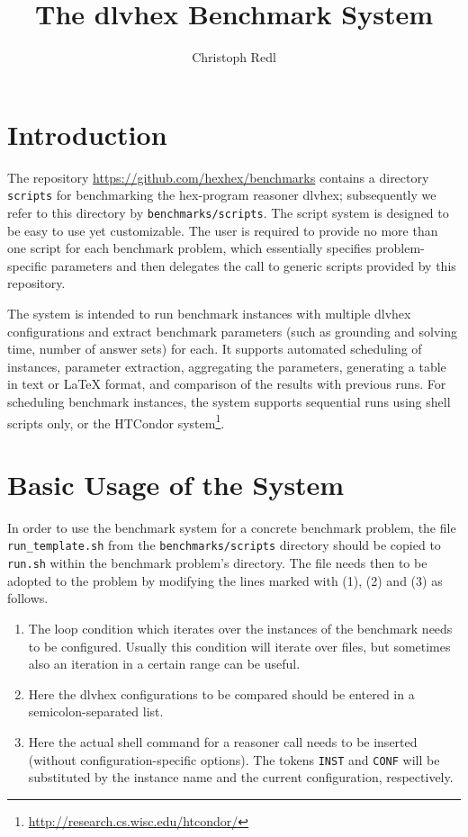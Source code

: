 \documentclass[a4paper]{article}
\newcommand{\dlvhex}{{\sc dlvhex}}
\newcommand{\hex}{{\sc hex}}
\begin{document}
	
	\title{The \dlvhex{} Benchmark System}
	\author{Christoph Redl}
	\maketitle
	
	\section{Introduction}
	\label{sec:introduction}

		The repository \url{https://github.com/hexhex/benchmarks}
		contains a directory {\tt scripts} for benchmarking the \hex-program reasoner \dlvhex;
		subsequently we refer to this directory by {\tt benchmarks/scripts}.
		The script system is designed to be easy to use yet customizable.
		The user is required to provide no more than one script for each benchmark problem,
		which essentially specifies problem-specific parameters and then delegates the call
		to generic scripts provided by this repository.
		
		The system
		is intended to run benchmark instances with multiple \dlvhex{} configurations
		and extract benchmark parameters (such as grounding and solving time, number of answer sets) for each.
		It supports automated scheduling of instances, parameter extraction,
		aggregating the parameters,
		generating a table in text or \LaTeX{} format,
		and comparison of the results with previous runs.
		For scheduling benchmark instances, the system supports sequential runs using shell scripts only,
		or the HTCondor system\footnote{\url{http://research.cs.wisc.edu/htcondor/}}.

	\section{Basic Usage of the System}
	\label{sec:usage}
			
		In order to use the benchmark system for a concrete benchmark problem,
		the file {\tt run\_template.sh} from the {\tt benchmarks/scripts} directory
		should be copied to {\tt run.sh} within the benchmark problem's directory.
		The file needs then to be adopted to the problem by modifying the lines
		marked with (1), (2) and (3) as follows.
		\begin{enumerate}
		\item[(1)] The loop condition which iterates over the instances of the benchmark needs to be configured.
			Usually this condition will iterate over files, but sometimes also an iteration in a certain range can be useful.
		\item[(2)] Here the \dlvhex{} configurations to be compared should be entered in a semicolon-separated list.
		\item[(3)] Here the actual shell command for a reasoner call needs to be inserted (without configuration-specific options).
			The tokens {\tt INST} and {\tt CONF} will be substituted by the instance name and the current configuration, respectively.
		\end{enumerate}
		
\end{document}

